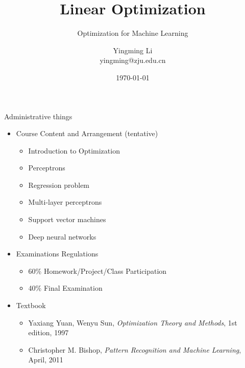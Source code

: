 \documentclass[notes]{beamer}
\title[Opt for ML]{Linear Optimization}
\subtitle{Optimization for Machine Learning}
\author[YingmingLi]{Yingming Li \\ yingming@zju.edu.cn}
\institute[DSERC, ZJU]{Data Science \& Engineering Research Center, ZJU}
\date[\today]{\today}
\begin{document}

\begin{frame}{Administrative things}
	\begin{itemize}
		\item Course Content and Arrangement (tentative)
		      \begin{itemize}
			      \item Introduction to Optimization
			      \item Perceptrons
			      \item Regression problem
			      \item Multi-layer perceptrons
			      \item Support vector machines
			      \item Deep neural networks
		      \end{itemize}
		\item   Examinations Regulations
		      \begin{itemize}
			      \item 60\% Homework/Project/Class Participation
			      \item 40\% Final Examination
		      \end{itemize}
		\item Textbook
		      \begin{itemize}
			      \item Yaxiang Yuan, Wenyu Sun, \textit{Optimization Theory and Methods}, 1st edition, 1997
			      \item Christopher M. Bishop, \textit{Pattern Recognition and Machine Learning}, April, 2011
		      \end{itemize}
	\end{itemize}

\end{frame}
\end{document}
